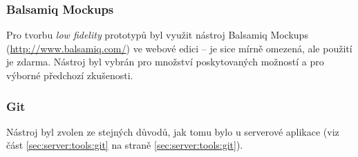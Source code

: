 \subsubsection{Balsamiq Mockups}
Pro tvorbu \textit{low fidelity} prototypů byl využit nástroj Balsamiq Mockups (\url{http://www.balsamiq.com/}) ve webové edici -- je sice mírně omezená, ale použití je zdarma. Nástroj byl vybrán pro množství poskytovaných možností a pro výborné předchozí zkušenosti.

\subsubsection{Git}
Nástroj byl zvolen ze stejných důvodů, jak tomu bylo u serverové aplikace (viz část \ref{sec:server:tools:git} na straně \ref{sec:server:tools:git}).

